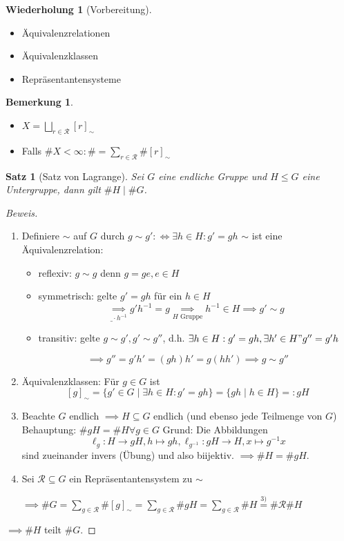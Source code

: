 \documentclass[a4paper]{article}
\theoremstyle{plain}
\newtheorem{satz}[thm]{Satz}
\theoremstyle{definition}
\newtheorem*{bem*}{Bemerkung}
\newtheorem*{whg*}{Wiederholung}
\begin{document}
\begin{whg*}[Vorbereitung]
  \item
\begin{itemize}
\item Äquivalenzrelationen
\item Äquivalenzklassen
\item Repräsentantensysteme
\end{itemize}
\end{whg*}

\begin{bem*} \item
  \begin{itemize}
        \item $X = \bigsqcup_{r \in \mathcal R} [r]_{\sim}$
        \item Falls $\#X < \infty : \# = \sum_{r \in \mathcal R} \# [r]_{\sim}$ %
  \end{itemize}
\end{bem*}

\begin{satz}[Satz von Lagrange]
Sei $G$ eine endliche Gruppe und $H \le G$ eine Untergruppe, dann gilt $\#H \mid \#G$.
\end{satz}
\begin{proof}[Beweis] \item
  \begin{enumerate} [1)]
    \item Definiere $\sim$ auf $G$ durch $g \sim g' :\iff \exists h \in H : g' = gh$
          $\sim$ ist eine Äquivalenzrelation:
          \begin{itemize}
            \item reflexiv: $g \sim g$ denn $g = ge, e \in H$
            \item symmetrisch: gelte $g' = gh$ für ein $h \in H$ $$\underset{\_\cdot h^{-1}}{\implies} g'h^{-1}=g \underset{H \text{ Gruppe}} \implies h^{-1} \in H \implies g' \sim g$$
            \item transitiv: gelte $g \sim g', g' \sim g''$, d.h. $\exists h \in H : g' = gh, \exists h' \in H " g'' = g'h$
          \end{itemize}
            $$\implies g'' = g'h' = (gh)h' = g(hh') \implies g \sim g''$$
    \item Äquivalenzklassen: Für $g \in G$ ist
    $$[g]_{\sim} = \{g' \in G \mid \exists h \in H : g' = gh\} = \{gh \mid h \in H\} =: gH$$
    \item Beachte $G$ endlich $\implies H \subseteq G$ endlich (und ebenso jede Teilmenge von $G$)
        Behauptung: $\#gH = \#H \forall g \in G$
        Grund: Die Abbildungen $$\ell_{g}: H \to gH, h \mapsto gh, \ell_{g^{-1}}: gH \to H, x \mapsto g^{-1}x$$ sind zueinander invers (Übung) und also biijektiv. $\implies \#H = \#gH$.
    \item Sei $\mathcal R \subseteq G$ ein Repräsentantensystem zu $\sim$

          $\implies \#G = \sum_{g \in \mathcal R} \# [g]_{\sim} = \sum_{g \in \mathcal R} \#gH = \sum_{g \in \mathcal R} \#H \overset{3)}= \# \mathcal R \# H$
  \end{enumerate}
$\implies \#H$ teilt $\#G$.
\end{proof}
\end{document}
